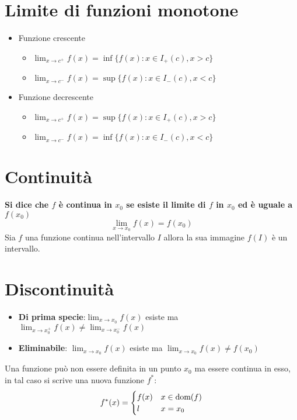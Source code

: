 \documentclass[12pt, a4paper]{report}
\begin{document}
    \section{Limite di funzioni monotone}
    \begin{itemize}
        \item Funzione crescente \begin{itemize}
            \item $\lim_{x\to c^{+}}f(x)=\inf\{f(x):x\in I_{+}(c),x>c\}$
            \item $\lim_{x\to c^{-}}f(x)=\sup\{f(x):x\in I_{-}(c),x<c\}$
        \end{itemize}
        \item Funzione decrescente \begin{itemize}
            \item $\lim_{x\to c^{+}}f(x)=\sup\{f(x):x\in I_{+}(c),x>c\}$
            \item $\lim_{x\to c^{-}}f(x)=\inf\{f(x):x\in I_{-}(c),x<c\}$
        \end{itemize}
    \end{itemize}
    \section{Continuità}
    \textbf{Si dice che $f$ è continua in $x_{0}$ se esiste il limite di $f$ in $x_{0}$ ed è uguale a $f(x_{0})$}
    \begin{equation*}
        \lim_{x\to x_{0}}f(x)=f(x_{0})
    \end{equation*}
    Sia $f$ una funzione continua nell'intervallo $I$ allora la sua immagine $f(I)$ è un intervallo.
    \section{Discontinuità}
    \begin{itemize}
        \item \textbf{Di prima specie}:$\lim_{x\to x_{0}}f(x)$ esiste ma $\lim_{x\to x_{0}^{+}}f(x)\neq \lim_{x\to x_{0}^{-}}f(x)$
        \item \textbf{Eliminabile}: $\lim_{x\to x_{0}}f(x)$ esiste ma $\lim_{x\to x_{0}}f(x)\neq f(x_{0})$
    \end{itemize}
    Una funzione può non essere definita in un punto $x_{0}$ ma essere continua in esso, in tal caso si scrive una nuova funzione $f^{*}$:
    \begin{equation*}
        f^{*}(x)=\begin{cases}
            f(x) & x\in \text{dom}(f)\\
            l & x=x_{0}
        \end{cases}
    \end{equation*}
\end{document}
